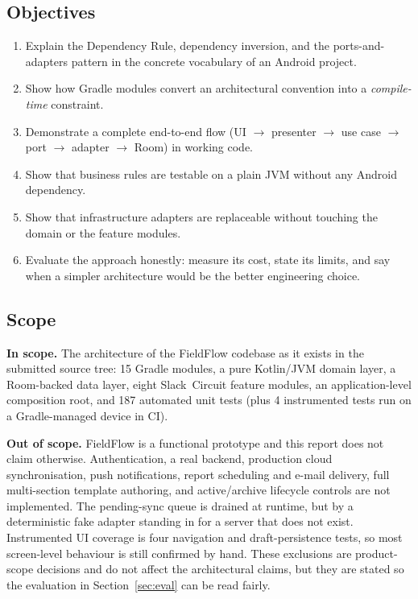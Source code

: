 \documentclass[11pt,a4paper]{article}
\begin{document}
\subsection{Objectives}

\begin{enumerate}[leftmargin=*]
  \item Explain the Dependency Rule, dependency inversion, and the ports-and-%
        adapters pattern in the concrete vocabulary of an Android project.
  \item Show how Gradle modules convert an architectural convention into a
        \emph{compile-time} constraint.
  \item Demonstrate a complete end-to-end flow (UI $\rightarrow$ presenter
        $\rightarrow$ use case $\rightarrow$ port $\rightarrow$ adapter
        $\rightarrow$ Room) in working code.
  \item Show that business rules are testable on a plain JVM without any Android
        dependency.
  \item Show that infrastructure adapters are replaceable without touching the
        domain or the feature modules.
  \item Evaluate the approach honestly: measure its cost, state its limits, and
        say when a simpler architecture would be the better engineering choice.
\end{enumerate}

\subsection{Scope}

\textbf{In scope.} The architecture of the FieldFlow codebase as it exists in
the submitted source tree: 15 Gradle modules, a pure Kotlin/JVM domain layer, a
Room-backed data layer, eight Slack~Circuit feature modules, an application-level
composition root, and 187 automated unit tests (plus 4 instrumented tests run on
a Gradle-managed device in CI).

\textbf{Out of scope.} FieldFlow is a functional prototype and this report does
not claim otherwise. Authentication, a real backend, production cloud
synchronisation, push notifications, report scheduling and e-mail delivery, full
multi-section template authoring, and active/archive lifecycle controls are not
implemented. The pending-sync queue is drained at runtime, but by a deterministic
fake adapter standing in for a server that does not exist. Instrumented UI
coverage is four navigation and draft-persistence tests, so most screen-level
behaviour is still confirmed by hand. These exclusions are product-scope
decisions and do not affect the architectural claims, but they are stated so the
evaluation in Section~\ref{sec:eval} can be read fairly.
\end{document}
